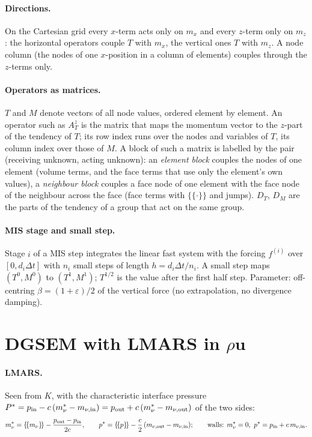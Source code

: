 \documentclass[11pt,a4paper]{article}
\newcommand{\avg}[1]{\{\!\{#1\}\!\}}
\newcommand{\dt}{\Delta t}
\begin{document}
\paragraph{Directions.} On the Cartesian grid every $x$-term acts only on $m_x$ and every $z$-term only on $m_z$: the horizontal operators
couple $T$ with $m_x$, the vertical ones $T$ with $m_z$. A node column (the nodes of one $x$-position in a column of elements) couples
through the $z$-terms only.

\paragraph{Operators as matrices.} $T$ and $M$ denote vectors of all node values, ordered element by element. An operator such as $A_T^z$ is the matrix that maps the momentum vector to the
$z$-part of the tendency of $T$; its row index runs over the nodes and variables of $T$, its column index over those of $M$. A block of
such a matrix is labelled by the pair (receiving unknown, acting unknown): an \emph{element block} couples the nodes of one element (volume
terms, and the face terms that use only the element's own values), a \emph{neighbour block} couples a face node of one element with the
face node of the neighbour across the face (face terms with $\avg\cdot$ and jumps). $D_T$, $D_M$ are the parts of the tendency of a group that act on the same group.

\paragraph{MIS stage and small step.} Stage $i$ of a MIS step integrates the linear fast system with the forcing $f^{(i)}$ over $[0,d_i\dt]$ with
$n_i$ small steps of length $h=d_i\dt/n_i$. A small step maps $(T^0,M^0)$ to $(T^1,M^1)$; $T^{1/2}$ is the value after the first half step. Parameter: off-centring $\beta=(1+\varepsilon)/2$ of the
vertical force (no extrapolation, no divergence damping).

\section{DGSEM with LMARS in $\rho\mathbf u$}
\paragraph{LMARS.} Seen from $K$, with the characteristic interface pressure $P^*=p_{\rm in}-c\,(m^*_\nu-m_{\nu,\rm in})=p_{\rm out}+c\,(m^*_\nu-m_{\nu,\rm out})$ of the two
sides:
\[
m^*_\nu=\avg{m_\nu}-\frac{p_{\rm out}-p_{\rm in}}{2c},\qquad p^*=\avg p-\frac c2\,(m_{\nu,\rm out}-m_{\nu,\rm in});\qquad\text{walls: }m^*_\nu=0,\ p^*=p_{\rm in}+c\,m_{\nu,\rm in}.
\]
\end{document}
